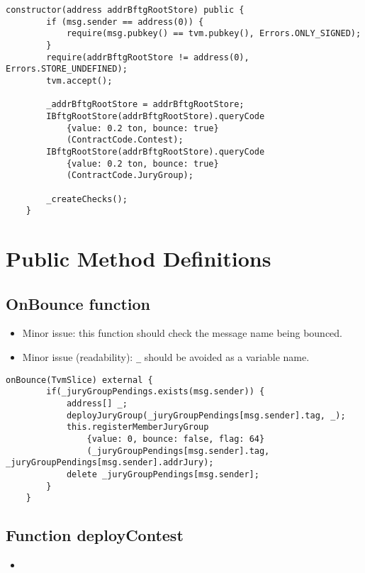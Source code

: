 \begin{lstlisting}[firstnumber=36]
    constructor(address addrBftgRootStore) public {
        if (msg.sender == address(0)) {
            require(msg.pubkey() == tvm.pubkey(), Errors.ONLY_SIGNED);
        }
        require(addrBftgRootStore != address(0), Errors.STORE_UNDEFINED);
        tvm.accept();

        _addrBftgRootStore = addrBftgRootStore;
        IBftgRootStore(addrBftgRootStore).queryCode
            {value: 0.2 ton, bounce: true}
            (ContractCode.Contest);
        IBftgRootStore(addrBftgRootStore).queryCode
            {value: 0.2 ton, bounce: true}
            (ContractCode.JuryGroup);

        _createChecks();
    }
\end{lstlisting}

\section{Public Method Definitions}


\subsection{OnBounce function}

\begin{itemize}
\item Minor issue: this function should check the message name being
  bounced.
\item Minor issue (readability): {\tt \_} should be avoided as a
  variable name.
\end{itemize}

\begin{lstlisting}[firstnumber=83]
    onBounce(TvmSlice) external {
        if(_juryGroupPendings.exists(msg.sender)) {
            address[] _;
            deployJuryGroup(_juryGroupPendings[msg.sender].tag, _);
            this.registerMemberJuryGroup
                {value: 0, bounce: false, flag: 64}
                (_juryGroupPendings[msg.sender].tag, _juryGroupPendings[msg.sender].addrJury);
            delete _juryGroupPendings[msg.sender];
        }
    }
\end{lstlisting}

\subsection{Function deployContest}

\begin{itemize}
\item {}
\end{itemize}

